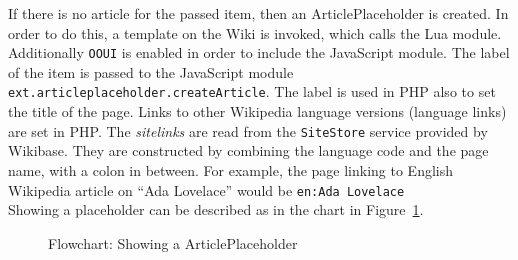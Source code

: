 If there is no article for the passed item, then an ArticlePlaceholder is created. In order to do this, a template on the Wiki is invoked, which calls the Lua module. Additionally \texttt{\justify OOUI} is enabled in order to include the JavaScript module. The label of the item is passed to the JavaScript module \texttt{\justify ext.articleplaceholder.createArticle}. The label is used in PHP also to set the title of the page. Links to other Wikipedia language versions (language links) are set in PHP. The \textit{sitelinks} are read from the \texttt{\justify SiteStore} service provided by Wikibase. They are constructed by combining the language code and the page name, with a colon in between. For example, the page linking to English Wikipedia article on ``Ada Lovelace'' would be \texttt{\justify en:Ada Lovelace}\\
Showing a placeholder can be described as in the chart in Figure~\ref{fig:showpl}. 
\begin{figure}[H]
	\centering
	
	\caption{Flowchart: Showing a ArticlePlaceholder}
	\label{fig:showpl}
\end{figure}
